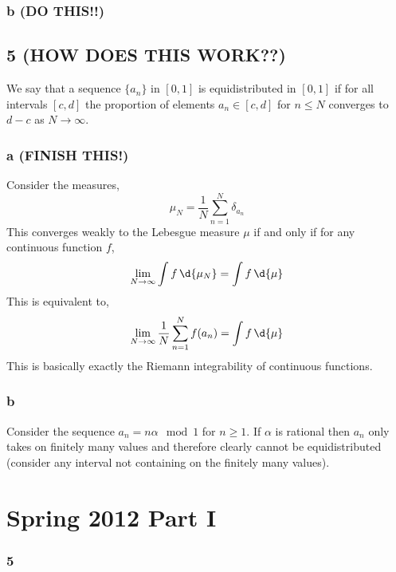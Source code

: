 \documentclass[12pt]{article}
\begin{document}
\subsubsection{b (DO THIS!!)}

\subsection{5 (HOW DOES THIS WORK??)}

We say that a sequence $\{ a_n \}$ in $[0, 1]$ is equidistributed in $[0,1]$ if for all intervals $[c,d]$ the proportion of elements $a_n \in [c,d]$ for $n \le N$ converges to $d - c$ as $N \to \infty$.

\subsubsection{a (FINISH THIS!)}

Consider the measures,
\[ \mu_N = \frac{1}{N} \sum_{n = 1}^N \delta_{a_n} \]
This converges weakly to the Lebesgue measure $\mu$ if and only if for any continuous function $f$,
\[ \lim_{N \to \infty} \int f \, \d{\mu_N} = \int f \, \d{\mu} \]
This is equivalent to,
\[ \lim_{N \to \infty} \frac{1}{N} \sum_{n = 1}^N f(a_n) = \int f \, \d{\mu} \]
This is basically exactly the Riemann integrability of continuous functions. 


\subsubsection{b}

Consider the sequence $a_n = n \alpha \mod 1$ for $n \ge 1$. If $\alpha$ is rational then $a_n$ only takes on finitely many values and therefore clearly cannot be equidistributed (consider any interval not containing on the finitely many values). 



\section{Spring 2012 Part I}

\subsubsection{5}
\end{document}
